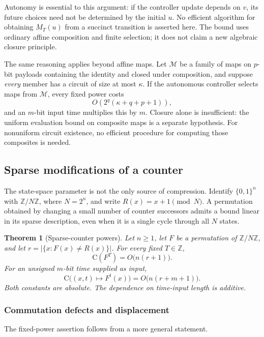\documentclass[11pt]{article}
\newtheorem{theorem}{Theorem}[section]
\theoremstyle{definition}
\theoremstyle{remark}
\newcommand{\bits}{\{0,1\}}
\newcommand{\CC}{\mathrm{C}}
\numberwithin{equation}{section}
\begin{document}
Autonomy is essential to this argument: if the controller update depends
on $v$, its future choices need not be determined by the initial $u$.
No efficient algorithm for obtaining $M_T(u)$ from a succinct transition
is asserted here.  The bound uses ordinary affine composition and finite
selection; it does not claim a new algebraic closure principle.

The same reasoning applies beyond affine maps.  Let $\mathcal M$ be a
family of maps on $p$-bit payloads containing the identity and closed under
composition, and suppose \emph{every} member has a circuit of size at
most $\kappa$.  If the autonomous controller selects maps from
$\mathcal M$, every fixed power costs
\[
 O\!\left(2^q(\kappa+q+p+1)\right),
\]
and an $m$-bit input time multiplies this by $m$.  Closure alone is insufficient: the uniform evaluation
bound on composite maps is a separate hypothesis.  For nonuniform circuit
existence, no efficient procedure for computing those composites is needed.

\subsection{Sparse modifications of a counter}\label{sec:sparse-counter}

The state-space parameter is not the only source of compression.  Identify
$\bits^n$ with $\mathbb Z/N\mathbb Z$, where $N=2^n$, and write
$R(x)=x+1\pmod N$.  A permutation obtained by changing a small number of
counter successors admits a bound linear in its sparse description, even
when it is a single cycle through all $N$ states.

\begin{theorem}[Sparse-counter powers]\label{thm:sparse-counter}
Let $n\geq1$, let $F$ be a permutation of $\mathbb Z/N\mathbb Z$, and let
$r=|\{x:F(x)\ne R(x)\}|$.  For every fixed $T\in\mathbb Z$,
\[
 \CC(F^T)=O\bigl(n(r+1)\bigr).
\]
For an unsigned $m$-bit time supplied as input,
\[
 \CC\bigl((x,t)\mapsto F^t(x)\bigr)=O\bigl(n(r+m+1)\bigr).
\]
Both constants are absolute.  The dependence on time-input length is additive.
\end{theorem}

\subsubsection{Commutation defects and displacement}

The fixed-power assertion follows from a more general statement.
\end{document}
